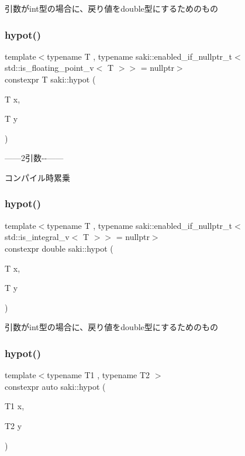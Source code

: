 引数がint型の場合に、戻り値をdouble型にするためのもの 

\mbox{\label{namespacesaki_a0dfe75bfa0e5223a0390c5e2941e69bc}} 
\subsubsection{\texorpdfstring{hypot()}{hypot()}\hspace{0.1cm}{\footnotesize\ttfamily [1/6]}}
{\footnotesize\ttfamily template$<$typename T , typename saki\+::enabled\+\_\+if\+\_\+nullptr\+\_\+t$<$ std\+::is\+\_\+floating\+\_\+point\+\_\+v$<$ T $>$$>$  = nullptr$>$ \\
constexpr T saki\+::hypot (\begin{DoxyParamCaption}\item[{T}]{x,  }\item[{T}]{y }\end{DoxyParamCaption})}



------2引数-\/-\/------ 

コンパイル時累乗 \mbox{\label{namespacesaki_ad888da163ba5c006d664d564fb48f7a7}} 
\subsubsection{\texorpdfstring{hypot()}{hypot()}\hspace{0.1cm}{\footnotesize\ttfamily [2/6]}}
{\footnotesize\ttfamily template$<$typename T , typename saki\+::enabled\+\_\+if\+\_\+nullptr\+\_\+t$<$ std\+::is\+\_\+integral\+\_\+v$<$ T $>$$>$  = nullptr$>$ \\
constexpr double saki\+::hypot (\begin{DoxyParamCaption}\item[{T}]{x,  }\item[{T}]{y }\end{DoxyParamCaption})}



引数がint型の場合に、戻り値をdouble型にするためのもの 

\mbox{\label{namespacesaki_add6327614e0d389d7545d1ffb151602b}} 
\subsubsection{\texorpdfstring{hypot()}{hypot()}\hspace{0.1cm}{\footnotesize\ttfamily [3/6]}}
{\footnotesize\ttfamily template$<$typename T1 , typename T2 $>$ \\
constexpr auto saki\+::hypot (\begin{DoxyParamCaption}\item[{T1}]{x,  }\item[{T2}]{y }\end{DoxyParamCaption})}



